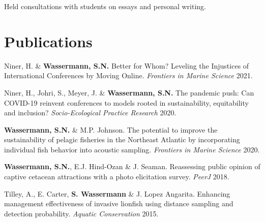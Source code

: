 \documentclass[a4paper]{deedy-resume} %
\begin{document}
\begin{flushleft}
Held consultations with students on essays and personal writing.

\sectionspace %



\section{Publications} 

\begin{tightitemize}
\item Niner, H. \& \textbf{Wassermann, S.N.} Better for Whom? Leveling the Injustices of International Conferences by Moving Online. \textit{Frontiers in Marine Science} 2021.
\item Niner, H., Johri, S., Meyer, J. \& \textbf{Wassermann, S.N.} The pandemic push: Can COVID-19 reinvent conferences to models rooted in sustainability, equitability and inclusion? \textit{Socio-Ecological  Practice Research} 2020.
\item \textbf{Wassermann, S.N.} \& M.P. Johnson. The potential to improve the sustainability of pelagic fisheries in the Northeast Atlantic by incorporating individual fish behavior into acoustic sampling. \textit{Frontiers in Marine Science} 2020. 
\item \textbf{Wassermann, S.N.}, E.J. Hind-Ozan \& J. Seaman. 
Reassessing public opinion of captive cetacean attractions with a photo elicitation survey. \textit{PeerJ} 2018.
\item Tilley, A., E. Carter, \textbf{S. Wassermann} \& J. Lopez Angarita. Enhancing management effectiveness of invasive lionfish using distance sampling and detection probability. \textit{Aquatic Conservation} 2015.
\end{tightitemize}

\sectionspace


\end{flushleft}
\end{document}
